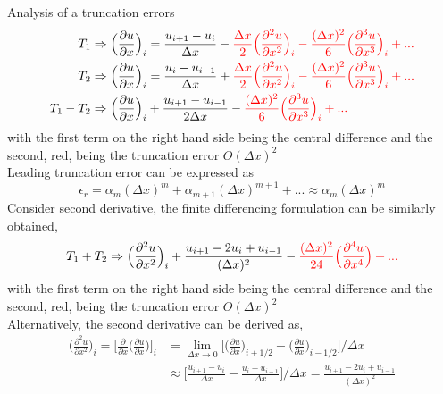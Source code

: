 \documentclass{article}
\begin{document}
Analysis of a truncation errors 
\begin{equation}
	\begin{aligned}
	T_1 &\Rightarrow \Big(\frac{\partial u}{\partial x}\Big)_i = \frac{u_{i+1} - u_i}{\Delta x} - \textcolor{red}{\frac{\Delta x}{2}\Big(\frac{\partial^2 u}{\partial x^2}\Big)_i - \frac{(\Delta x)^2}{6}\Big(\frac{\partial^3 u}{\partial x^3}\Big)_i + ...} \\
	T_2 &\Rightarrow \Big(\frac{\partial u}{\partial x}\Big)_i = \frac{u_i - u_{i-1}}{\Delta x} + \textcolor{red}{\frac{\Delta x}{2}\Big(\frac{\partial^2 u}{\partial x^2}\Big)_i - \frac{(\Delta x)^2}{6}\Big(\frac{\partial^3 u}{\partial x^3}\Big)_i + ...} \\
	T_1 - T_2 &\Rightarrow \Big(\frac{\partial u}{\partial x}\Big)_i + \frac{u_{i+1} - u_{i-1}}{2\Delta x} - \textcolor{red}{ \frac{(\Delta x)^2}{6}\Big(\frac{\partial^3 u}{\partial x^3}\Big)_i + ... } 
	\end{aligned}
\end{equation}
with the first term on the right hand side being the central difference and the second, red, being the truncation error $O(\Delta x)^2$ \\
Leading truncation error can be expressed as 
\begin{equation}
	\epsilon_r = \alpha_m(\Delta x)^m + \alpha_{m+1}(\Delta x)^{m+1} + ... \approx \alpha_m(\Delta x)^m
\end{equation}
%
Consider second derivative, the finite differencing formulation can be similarly obtained, 
\begin{equation}
	T_1 + T_2 \Rightarrow \Big(\frac{\partial^2 u}{\partial x^2}\Big)_i + \frac{u_{i+1} - 2u_i +  u_{i-1}}{(\Delta x)^2} - \textcolor{red}{ \frac{(\Delta x)^2}{24}\Big(\frac{\partial^4 u}{\partial x^4}\Big) + ... } 
\end{equation}
with the first term on the right hand side being the central difference and the second, red, being the truncation error $O(\Delta x)^2$ \\
Alternatively, the second derivative can be derived as,
\begin{equation}
\begin{aligned}
	\Big(\frac{\partial^2 u}{\partial x^2}\Big)_i = \Big[\frac{\partial}{\partial x}\Big(\frac{\partial u}{\partial x}\Big)\Big]_i & = \lim\limits_{\Delta x \rightarrow 0}\Big[\Big(\frac{\partial u}{\partial x}\Big)_{i+1/2} - \Big(\frac{\partial u}{\partial x}\Big)_{i-1/2}\Big] \Big/\Delta x \\
	& \approx \Big[\frac{u_{i+1} - u_i}{\Delta x} - \frac{u_i - u_{i-1}}{\Delta x}\Big] \Big/ \Delta x = \frac{u_{i+1} - 2u_i + u_{i-1}}{(\Delta x)^2}
\end{aligned}
\end{equation}
\end{document}

